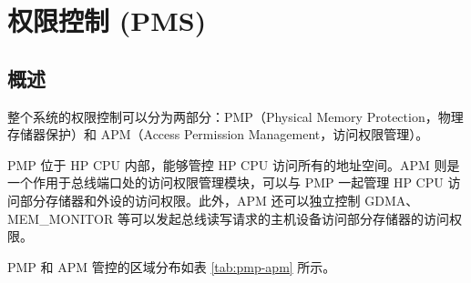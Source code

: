 \documentclass[main\_\_CN.tex]{subfiles}
\begin{document}

\ifglobal
\else
    \listoftodos
    {\let\clearpage\relax \listofdonetodos}
    \tableofcontents
\fi




\hypertarget{permctrl}{}
\chapter{权限控制 (PMS)}
\label{mod:permctrl}

\section{概述}

\chipname{} 整个系统的权限控制可以分为两部分：PMP（Physical Memory Protection，物理存储器保护）和 APM（Access Permission Management，访问权限管理）。

PMP 位于 HP CPU 内部，能够管控 HP CPU 访问所有的地址空间。APM 则是一个作用于总线端口处的访问权限管理模块，可以与 PMP 一起管理 HP CPU 访问部分存储器和外设的访问权限。此外，APM 还可以独立控制 GDMA、MEM\_MONITOR 等可以发起总线读写请求的主机设备访问部分存储器的访问权限。

PMP 和 APM 管控的区域分布如表 \ref{tab:pmp-apm} 所示。
\end{document}
